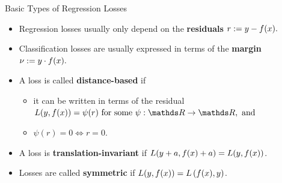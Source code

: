 
\begin{vbframe}{Basic Types of Regression Losses}


\begin{itemize}
  \small
  \item Regression losses usually only depend on the \textbf{ residuals}
  $r := y - f(x).$
  \item Classification losses are usually expressed in terms of the 
  \textbf{margin} $\nu := y \cdot f(x).$
  \item A loss is called \textbf{distance-based} if
  \begin{itemize}
    \small
    \item it can be written in terms of the residual
    $\Lxy = \psi (r) \text{ for some } \psi: \R \to \R, ~ \text{and}$
    \item $\psi(r) = 0 \Leftrightarrow r = 0$.
  \end{itemize}
  \item A loss is \textbf{translation-invariant} if $L(y + a, f(x) + a) = L(y, f(x))$.
  \item Losses are called \textbf{symmetric} if $L(y, f(x)) = L\left(f(x), y\right)$. 
\end{itemize}

\vfill


\end{vbframe}
